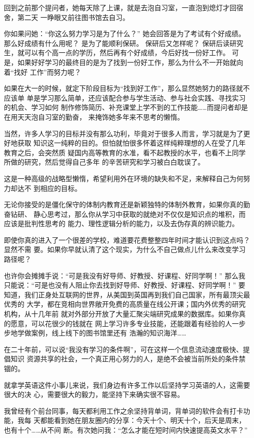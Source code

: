 \documentclass[11pt]{ctexart}
\begin{document}
{{{{回到之前那个提问者，她每天除了上课，就是去泡自习室，一直泡到熄灯才回宿舍，第二天
一睁眼又前往图书馆去自习。

你如果问她：“你这么努力学习是为了什么？”
她会回答是为了考试有个好成绩。
那么好成绩有什么用呢？
是为了能顺利保研。
保研后又怎样呢？
保研后读研究生，就可以有个高一点的学历，然后再有个好成绩，今后好找一份好工作。
可是，如果好好学习的最终目的是为了找到一份好工作，那么为什么不一开始就向着“找好
工作”而努力呢？

如果在大一的时候，就定下阶段目标为“找到好工作”，那么显然她努力的路径就不应该单
单是学习那么简单，还应该配合参与学生活动、参与社会实践、寻找实习的机会、学习如何
制作修饰简历、补充课堂上学不到的工作技能……而提问者却是在用天天泡自习室的勤奋，
来掩饰她多年来不思考的懒惰。

当然，许多人学习的目标并没有那么功利，毕竟对于很多人而言，学习就是为了更好地获取
知识这一纯粹的目的。但怕就怕很多怀着这样纯粹理想的人在受了几年教育之后，会突然质
疑国内高等教育的水准，看不起教授的水平，也看不上同学所做的研究，然后觉得自己多年
的辛苦研究和学习被白白耽误了。

这是一种高级的战略型懒惰，希望利用外在环境的缺失和不足，来解释自己为何努力却达不
到相应的目标。

无论你接受的是僵化保守的体制内教育还是新颖独特的体制外教育，如果你真的勤奋钻研、
静心思考过，那么你从学习中获取的就绝对不仅仅是知识点的堆积，而应该是批判性思考的
能力、理性逻辑分析的能力，以及去伪存真的辨识能力。

即使你真的进入了一个很差的学校，难道要花费整整四年时间才能认识到这点吗？显然不需
要。如果你早就认清了这个现实，为什么不自己做点儿什么来改变学习路径呢？

也许你会摊摊手说：“可是我没有好导师、好教授、好课程、好同学啊！”
那么我只能说：“可是也没有人阻止你去找到好导师、好教授、好课程、好同学啊！”
要知道，我们正身处互联网的世界，从美国到英国再到我们自己国家，所有最顶尖最优秀的
大学，都在竞相向世界敞开免费的高质量在线公开课；国内外优秀的研究机构，从十几年前
就对外部分开放了大量汇聚尖端研究成果的数据库。如果你真的愿意，可以花很少的钱就在
网上学习许多专业技能，还能跟着有经验的人一步步地学做案例，线上线下的图书馆里还有
浩瀚的知识海洋……

在二十年前，可以说“我没有学习的条件啊”，可在这样一个信息流动速度极快、提倡知识
资源共享的社会，一个真正用心努力的人，是绝不会被当前所处的条件禁锢的。

就拿学英语这件小事儿来说，我们身边有许多工作以后坚持学习英语的人，这需要很大的决
心，需要很大的毅力，能坚持下来确实很不容易。

我曾经有个前台同事，每天都利用工作之余坚持背单词，背单词的软件会有打卡功能，我每
天都能看到她在朋友圈内的分享：今天十个、明天十个，后天是周末，也有十个……从不间
断。有次她问我：“怎么才能在短时间内快速提高英文水平？”

}}}}
\end{document}
